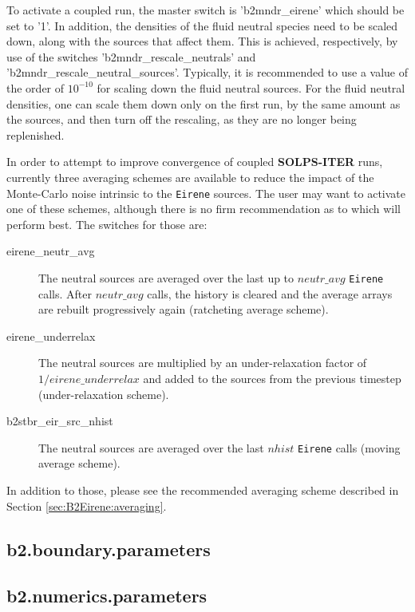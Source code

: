 \documentclass[a4paper,10pt]{report}
\newcommand\SOLPSITER{{\bf SOLPS-ITER} }
\begin{document}
To activate a coupled run, the master switch is 'b2mndr\_eirene' which should be set to '1'. In addition, the densities of the fluid neutral species need to be scaled down, along with the sources that affect them. This is achieved, respectively, by use of the switches 'b2mndr\_rescale\_neutrals' and 'b2mndr\_rescale\_neutral\_sources'. Typically, it is recommended to use a value of the order of $10^{-10}$ for scaling down the fluid neutral sources. For the fluid neutral densities, one can scale them down only on the first run, by the same amount as the sources, and then turn off the rescaling, as they are no longer being replenished.

In order to attempt to improve convergence of coupled \SOLPSITER runs, currently three
averaging schemes are available to reduce the impact of the Monte-Carlo noise intrinsic
to the {\tt Eirene} sources. The user may want to activate one of these schemes,
although there is no firm recommendation as to which will perform best. The switches
for those are:
\begin{description}
  \item[eirene\_neutr\_avg] The neutral sources are averaged over the last up to $neutr\_avg$ {\tt Eirene} calls. After $neutr\_avg$ calls, the history is cleared and the average arrays are rebuilt progressively again (ratcheting average scheme).
  \item[eirene\_underrelax] The neutral sources are multiplied by an under-relaxation factor of $1/eirene\_underrelax$ and added to the sources from the previous timestep (under-relaxation scheme).
  \item[b2stbr\_eir\_src\_nhist] The neutral sources are averaged over the last $nhist$ {\tt Eirene} calls (moving average scheme).
\end{description}

In addition to those, please see the recommended averaging scheme described in
Section \ref{sec:B2Eirene:averaging}.

\subsection{b2.boundary.parameters}

\subsection{b2.numerics.parameters}
\end{document}
